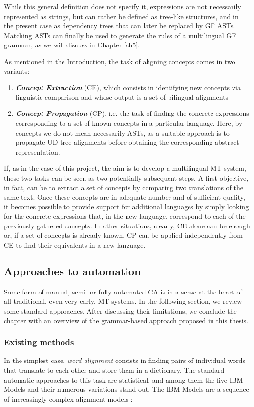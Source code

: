 While this general definition does not specify it, expressions are not necessarily represented as strings, but can rather be defined as tree-like structures, and in the present case as dependency trees that can later be replaced by GF ASTs. Matching ASTs can finally be used to generate the rules of a multilingual GF grammar, as we will discuss in Chapter \ref{ch5}. \smallskip

As mentioned in the Introduction, the task of aligning concepts comes in two variants:
\begin{enumerate}
    \item \textbf{\textit{Concept Extraction}} (CE), which consists in identifying new concepts via linguistic comparison and whose output is a set of bilingual alignments
    \item \textbf{\textit{Concept Propagation}} (CP), i.e. the task of finding the concrete expressions corresponding to a set of known concepts in a particular language. Here, by concepts we do not mean necessarily ASTs, as a suitable approach is to propagate UD tree alignments before obtaining the corresponding abstract representation.
\end{enumerate} \smallskip

If, as in the case of this project, the aim is to develop a multilingual MT system, these two tasks can be seen as two potentially subsequent steps. A first objective, in fact, can be to extract a set of concepts by comparing two translations of the same text. Once these concepts are in adequate number and of sufficient quality, it becomes possible to provide support for additional languages by simply looking for the concrete expressions that, in the new language, correspond to each of the previously gathered concepts. In other situations, clearly, CE alone can be enough or, if a set of concepts is already known, CP can be applied independently from CE to find their equivalents in a new language.

\subsection{Approaches to automation} 
Some form of manual, semi- or fully automated CA is in a sense at the heart of all traditional, even very early, MT systems. 
In the following section, we review some standard approaches. After discussing their limitations, we conclude the chapter with an overview of the grammar-based approach proposed in this thesis.

\subsubsection{Existing methods} \label{statmt}  
In the simplest case, \textit{word alignment} consists in finding pairs of individual words that translate to each other and store them in a dictionary. 
The standard automatic approaches to this task are statistical, and among them the five IBM Models \cite{ibm} and their numerous variations stand out. 
The IBM Models are a sequence of increasingly complex alignment models \cite{bitext}: \smallskip

